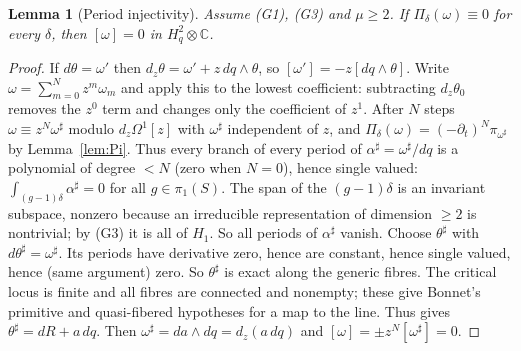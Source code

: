 \documentclass[11pt]{article}
\numberwithin{equation}{section}
\newtheorem{lemma}[lemma]{Lemma}
\theoremstyle{definition}
\theoremstyle{remark}
\newcommand{\C}{\mathbb C}
\newcommand{\Hq}{H_q^2}
\begin{document}
\begin{lemma}[Period injectivity]\label{lem:injective}
Assume \textup{(G1)}, \textup{(G3)} and $\mu\ge2$. If $\Pi_\delta(\omega)\equiv0$
for every $\delta$, then $[\omega]=0$ in $\Hq\otimes\C$.
\end{lemma}
\begin{proof}
If $d\theta=\omega'$ then $d_z\theta=\omega'+z\,dq\wedge\theta$, so
$[\omega']=-z[dq\wedge\theta]$. Write $\omega=\sum_{m=0}^Nz^m\omega_m$ and apply this to the lowest coefficient:
subtracting $d_z\theta_0$ removes the $z^0$ term and changes only the
coefficient of $z^1$. After $N$ steps $\omega\equiv z^N\omega^\sharp$ modulo
$d_z\Omega^1[z]$ with $\omega^\sharp$ independent of $z$, and
$\Pi_\delta(\omega)=(-\partial_t)^N\pi_{\omega^\sharp}$ by Lemma~\ref{lem:Pi}. Thus
every branch of every period of $\alpha^\sharp=\omega^\sharp/dq$ is a polynomial of
degree $<N$ (zero when $N=0$), hence single valued: $\int_{(g-1)\delta}\alpha^\sharp=0$ for all
$g\in\pi_1(S)$. The span of the $(g-1)\delta$ is an invariant subspace, nonzero
because an irreducible representation of dimension $\ge2$ is nontrivial; by
(G3) it is all of $H_1$. So all periods of $\alpha^\sharp$ vanish. Choose
$\theta^\sharp$ with $d\theta^\sharp=\omega^\sharp$. Its periods have derivative
zero, hence are constant, hence single valued, hence (same argument) zero. So
$\theta^\sharp$ is exact along the generic fibres. The critical locus is finite
and all fibres are connected and nonempty; these give Bonnet's primitive
and quasi-fibered hypotheses for a map to the line. Thus
\cite[Definitions~1.3--1.4 and Theorem~1.5]{Bonnet} gives
$\theta^\sharp=dR+a\,dq$. Then
$\omega^\sharp=da\wedge dq=d_z(a\,dq)$ and $[\omega]=\pm z^N[\omega^\sharp]=0$.
\end{proof}
\end{document}
